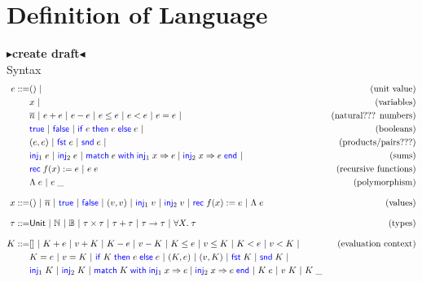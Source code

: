\documentclass[twoside,11pt,openright]{report}
\newcommand{\BNFdef}{::=}
\newcommand{\ALT}{~|~}
\newcommand{\Keyword}[1]{{\color{blue} \mathsf{#1}}}
\newcommand{\var}{x}
\newcommand{\expr}{e}
\newcommand{\val}{v}
\newcommand{\TT}{()}
\newcommand{\Num}[1]{\overline{#1}}
\newcommand{\True}{\Keyword{true}}
\newcommand{\False}{\Keyword{false}}
\newcommand{\IfCmd}{\Keyword{if}}
\newcommand{\ThenCmd}{\Keyword{then}}
\newcommand{\ElseCmd}{\Keyword{else}}
\def\If#1then#2else#3{\IfCmd{}\;#1\;\ThenCmd{}\;#2\;\ElseCmd{}\;#3}
\newcommand{\Fst}{\Keyword{fst}\;}
\newcommand{\Snd}{\Keyword{snd}\;}
\newcommand{\Inj}[1]{\Keyword{inj}_{#1}\;}
\newcommand{\MatchCmd}{\Keyword{match}}
\newcommand{\WithCmd}{\Keyword{with}}
\newcommand{\EndCmd}{\Keyword{end}}
\def\Match#1with#2=>#3|#4=>#5end{\MatchCmd{}\;#1\;\WithCmd{}\;#2\Rightarrow#3 \;|\;#4\Rightarrow#5\;\EndCmd{}}
\newcommand{\Tvar}{X}
\newcommand{\Tlam}{\Lambda\;}
\newcommand{\Tapp}[1]{#1\;\_}
\newcommand{\empelctx}{[]}
\newcommand{\elctx}{K}
\newcommand{\Tunit}{\mathsf{Unit}}
\newcommand{\Tnat}{\mathbb{N}}
\newcommand{\Tbool}{\mathbb{B}}
\newcommand{\Tprod}[2]{#1 \times #2}
\newcommand{\Tsum}[2]{#1 + #2}
\newcommand{\Tfunc}[2]{#1 \rightarrow #2}
\newcommand{\Tall}[2]{\forall #1.\; #2}
\newcommand{\typ}{\tau}
\newcommand{\todo}[1]{{\color[rgb]{.5,0,0}\textbf{$\blacktriangleright$#1$\blacktriangleleft$}}}
\begin{document}
\chapter{Definition of Language}
\label{ch:DoL}

\todo{create draft}\\
Syntax
\begin{align*}
  \expr \BNFdef & \TT \ALT & \text{(unit value)}\\
                & \var \ALT & \text{(variables)}\\
                & \Num{n} \ALT \expr + \expr \ALT \expr - \expr \ALT
                  \expr \le \expr \ALT \expr < \expr \ALT 
                  \expr = \expr \ALT & \text{(natural??? numbers)}\\
                & \True \ALT \False \ALT {\If \expr then \expr else \expr} \ALT
                  & \text{(booleans)}\\
                & (\expr, \expr) \ALT \Fst \expr \ALT \Snd \expr \ALT
                  & \text{(products/pairs???)}\\
                & \Inj{1} \expr \ALT \Inj{2} \expr \ALT 
                  \Match \expr with \Inj{1} \var => \expr | \Inj{2} \var => \expr end \ALT
                  & \text{(sums)}\\
                & \Rec f \var := \expr \ALT \expr \; \expr
                  & \text{(recursive functions)}\\
                & \Tlam \expr \ALT \Tapp{\expr} & \text{(polymorphism)}\\[8pt]
  \var \BNFdef  & \TT \ALT \Num{n} \ALT \True \ALT \False \ALT
                  (\val, \val) \ALT \Inj{1} \val \ALT \Inj{2} \val \ALT
                  \Rec f \var := \expr \ALT \Tlam \expr
                  & \text{(values)}\\[8pt]
  \typ \BNFdef  & \Tunit \ALT \Tnat \ALT \Tbool \ALT {\Tprod \typ \typ} \ALT
                  {\Tsum \typ \typ} \ALT {\Tfunc \typ \typ} \ALT 
                  {\Tall \Tvar \typ} & \text{(types)}\\[8pt]
  \elctx \BNFdef& \empelctx \ALT 
                  \elctx + \expr \ALT \val + \elctx \ALT
                  \elctx - \expr \ALT \val - \elctx \ALT
                  \elctx \le \expr \ALT \val \le \elctx \ALT
                  \elctx < \expr \ALT \val < \elctx \ALT 
                  & \text{(evaluation context)}\\
                & \elctx = \expr \ALT \val = \elctx \ALT
                  {\If \elctx then \expr else \expr} \ALT
                  (\elctx, \expr) \ALT (\val, \elctx) \ALT
                  \Fst \elctx \ALT \Snd \elctx \ALT\\
                & \Inj{1} \elctx \ALT \Inj{2} \elctx \ALT
                  \Match \elctx with \Inj{1} \var => \expr | \Inj{2} \var => \expr end \ALT
                  \elctx \; \expr \ALT \val \; \elctx \ALT \Tapp{\elctx}
\end{align*}
\end{document}

